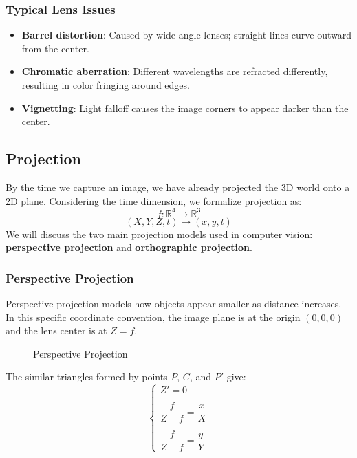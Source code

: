 \subsubsection{Typical Lens Issues}
\begin{itemize}
    \item \textbf{Barrel distortion}: Caused by wide-angle lenses; straight lines curve outward from the center.
    \item \textbf{Chromatic aberration}: Different wavelengths are refracted differently, resulting in color fringing around edges.
    \item \textbf{Vignetting}: Light falloff causes the image corners to appear darker than the center.
\end{itemize}

\subsection{Projection}
By the time we capture an image, we have already projected the 3D world onto a 2D plane. 
Considering the time dimension, we formalize projection as:
\[f: \mathbb{R}^4 \rightarrow \mathbb{R}^3\]
\[ (X, Y, Z, t) \mapsto (x, y, t)\]
We will discuss the two main projection models used in computer vision: \textbf{perspective projection} and \textbf{orthographic projection}.

\subsubsection{Perspective Projection}
Perspective projection models how objects appear smaller as distance increases. 
In this specific coordinate convention, the image plane is at the origin $(0,0,0)$ and the lens center is at $Z = f$.
\begin{figure}[H]
    \centering
    \scalebox{0.8}{
        
    }
    \caption{Perspective Projection}
\end{figure}

The similar triangles formed by points $P$, $C$, and $P'$ give:
\begin{equation*}
\begin{cases}
Z' = 0 \\\\
\dfrac{f}{Z - f} = \dfrac{x}{X} \\\\
\dfrac{f}{Z - f} = \dfrac{y}{Y}
\end{cases}
\end{equation*}

